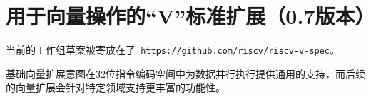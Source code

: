 \chapter{用于向量操作的“V”标准扩展（0.7版本）}
\label{sec:vector}

当前的工作组草案被寄放在了{\tt
https://github.com/riscv/riscv-v-spec}。

\begin{commentary}
  基础向量扩展意图在32位指令编码空间中为数据并行执行提供通用的支持，而后续的向量扩展会针对特定领域支持更丰富的功能性。
\end{commentary}
  


